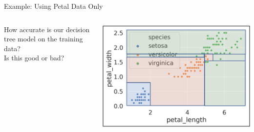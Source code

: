 \documentclass[aspectratio=169]{../latex_main/tntbeamer}  %
\begin{document}
	
	\begin{frame}{Example: Using Petal Data Only}
	   \begin{columns}
	        \begin{column}{.5\textwidth}
	               How accurate is our decision tree model on the training data?\\
	               \bigskip
	                Is this good or bad?
	        \end{column}
	   
	   
	         \begin{column}{.5\textwidth}

	                     \includegraphics[scale=.34]{Bild16}

	        \end{column}
	   \end{columns}
	 \end{frame}
	 
\end{document}

